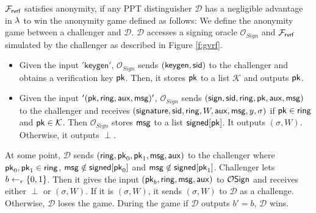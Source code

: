 \begin{definition}[Anonymity]\label{def:anonymity}
	$ \mathcal{F}_{\textsf{rvrf}} $ satisfies anonymity, if any PPT distinguisher $ \mathcal{D} $ has a negligible advantage in $ \lambda $ to win the anonymity game defined as follows:
	We define the anonymity game between a challenger and $ \mathcal{D} $.  $\mathcal{D}$ accesses a signing oracle $ \mathcal{O}_{Sign} $ and $ \mathcal{F}_{\textsf{rvrf}} $ simulated by the challenger as described in Figure \ref{f:gvrf}. 
	\begin{itemize}
		\item Given the input $ '\mathsf{keygen}' $, $\mathcal{O}_{Sign} $ sends $ (\mathsf{keygen, \textsf{sid}}) $ to the challenger and obtains a verification key $ \mathsf{pk} $. Then, it stores $ \mathsf{pk}  $ to a list $ \mathcal{K} $ and outputs $ \mathsf{pk} $.
		\item Given the input $ '(\mathsf{pk},\mathsf{ring},\mathsf{aux},\mathsf{msg})' $, $ \mathcal{O}_{Sign} $ sends $ (\mathsf{sign}, \textsf{sid},\mathsf{ring},\mathsf{pk}, \mathsf{aux}, \mathsf{msg}) $ to the challenger and receives $ (\mathsf{signature}, \textsf{sid}, \mathsf{ring}, W,\mathsf{aux}, \mathsf{msg}, y, \sigma) $ if $ \mathsf{pk} \in \mathsf{ring} $ and $\mathsf{pk} \in \mathcal{K}  $.  Then $ \mathcal{O}_{Sign} $ stores $ \mathsf{msg} $ to a list $ {\mathsf{signed}}[\mathsf{pk}]  $.
		It outputs $ (\sigma,W) $. Otherwise, it outputs $ \perp $.
	\end{itemize}
	At some point,	
	$ \mathcal{D} $ sends $ (\mathsf{ring}, \mathsf{pk}_0, \mathsf{pk}_1, \mathsf{msg},\mathsf{aux})$ to  the challenger where $ \mathsf{pk}_0, \mathsf{pk}_1 \in \mathsf{ring} $, $ \mathsf{msg}  \notin {\ensuremath{\mathsf{signed}}}[\mathsf{pk}_0]$ and $ \mathsf{msg}  \notin {\ensuremath{\mathsf{signed}}}[\mathsf{pk}_1] $.  Challenger lets $ b \leftarrow_r\{0,1\}$. Then it gives the input $ (\mathsf{pk}_b, \mathsf{ring}, \mathsf{msg},\mathsf{aux}) $ to $ \mathcal{O}\mathsf{Sign} $ and receives either $ \perp $ or $(\sigma,W)$. If it is $ (\sigma,W) $, it sends $ (\sigma,W) $ to $ \mathcal{D} $ as a challenge.
	Otherwise, $ \mathcal{D}  $ loses the game.
	During the game if $ \mathcal{D} $ outputs $ b' = b $, $ \mathcal{D} $ wins.
	
	
\end{definition}





%

